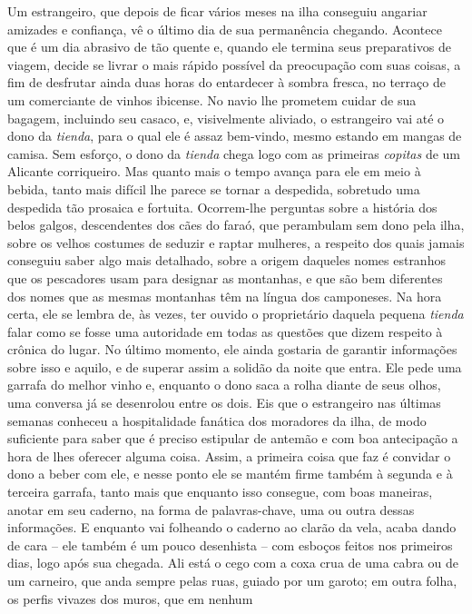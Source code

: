 Um estrangeiro, que depois de ficar vários meses na ilha conseguiu
angariar amizades e confiança, vê o último dia de sua permanência
chegando. Acontece que é um dia abrasivo de tão quente e, quando ele
termina seus preparativos de viagem, decide se livrar o mais rápido
possível da preocupação com suas coisas, a fim de desfrutar ainda duas
horas do entardecer à sombra fresca, no terraço de um comerciante de
vinhos ibicense. No navio lhe prometem cuidar de sua bagagem, incluindo
seu casaco, e, visivelmente aliviado, o estrangeiro vai até o dono da
\emph{tienda}, para o qual ele é assaz bem-vindo, mesmo estando em
mangas de camisa. Sem esforço, o dono da \emph{tienda} chega logo com as
primeiras \emph{copitas} de um Alicante corriqueiro. Mas quanto mais o
tempo avança para ele em meio à bebida, tanto mais difícil lhe parece se
tornar a despedida, sobretudo uma despedida tão prosaica e fortuita.
Ocorrem-lhe perguntas sobre a história dos belos galgos, descendentes
dos cães do faraó, que perambulam sem dono pela ilha, sobre os velhos
costumes de seduzir e raptar mulheres, a respeito dos quais jamais
conseguiu saber algo mais detalhado, sobre a origem daqueles nomes
estranhos que os pescadores usam para designar as montanhas, e que são
bem diferentes dos nomes que as mesmas montanhas têm na língua dos
camponeses. Na hora certa, ele se lembra de, às vezes, ter ouvido o
proprietário daquela pequena \emph{tienda} falar como se fosse uma
autoridade em todas as questões que dizem respeito à crônica do lugar.
No último momento, ele ainda gostaria de garantir informações sobre isso
e aquilo, e de superar assim a solidão da noite que entra. Ele pede uma
garrafa do melhor vinho e, enquanto o dono saca a rolha diante de seus
olhos, uma conversa já se desenrolou entre os dois. Eis que o
estrangeiro nas últimas semanas conheceu a hospitalidade fanática dos
moradores da ilha, de modo suficiente para saber que é preciso estipular
de antemão e com boa antecipação a hora de lhes oferecer alguma coisa.
Assim, a primeira coisa que faz é convidar o dono a beber com ele, e
nesse ponto ele se mantém firme também à segunda e à terceira garrafa,
tanto mais que enquanto isso consegue, com boas maneiras, anotar em seu
caderno, na forma de palavras-chave, uma ou outra dessas informações. E
enquanto vai folheando o caderno ao clarão da vela, acaba dando de cara
-- ele também é um pouco desenhista -- com esboços feitos nos primeiros
dias, logo após sua chegada. Ali está o cego com a coxa crua de uma
cabra ou de um carneiro, que anda sempre pelas ruas, guiado por um
garoto; em outra folha, os perfis vivazes dos muros, que em nenhum
